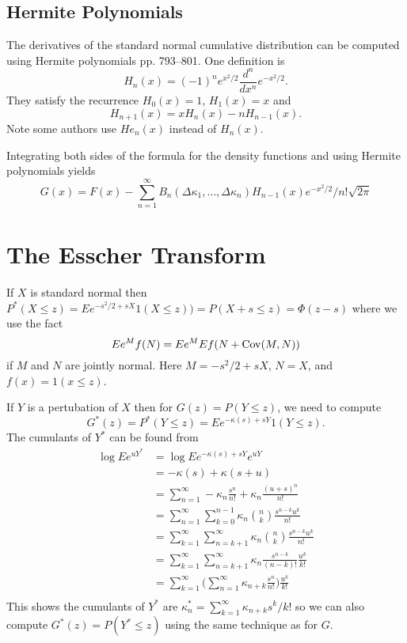 \documentclass[11pt]{article}
\newcommand{\Cov}{\mathop{\rm{Cov}}}
\theoremstyle{definition}
\begin{document}
\subsection{Hermite Polynomials}
The derivatives of the standard normal cumulative distribution 
can be computed using Hermite polynomials\cite{AbrSte1964}
pp. 793--801.
One definition is
\[
H_n(x) = (-1)^n e^{x^2/2}\frac{d^n}{dx^n}e^{-x^2/2}.
\]
They satisfy the recurrence \(H_0(x) = 1\), \(H_1(x) = x\) and
\[
H_{n+1}(x) = xH_n(x) - n H_{n-1}(x).
\]
Note some authors use \(He_n(x)\) instead of \(H_n(x)\).

Integrating both sides of the formula for the density
functions and using Hermite polynomials yields
\[
G(x) = F(x) - \sum_{n=1}^\infty
B_n(\Delta\kappa_1,\dots,\Delta\kappa_n) H_{n-1}(x)
e^{-x^2/2}/n!\sqrt{2\pi}
\]

\section{The Esscher Transform}

If \(X\) is standard normal then
\(P^*(X\le z) = Ee^{-s^2/2 + sX} 1(X\le z)) = P(X + s\le z)
= \Phi(z - s)\)
where we use the fact
\[
Ee^M f(N) = Ee^M Ef(N + \Cov(M,N))
\]
if \(M\) and \(N\) are
jointly normal. Here \(M = -s^2/2 + sX\), \(N = X\), and \(f(x) = 1(x\le z)\).

If \(Y\) is a pertubation of \(X\) then
for \(G(z) = P(Y\le z)\), we need to compute
\[
G^*(z) = P^*(Y\le z) = Ee^{-\kappa(s) + sY}1(Y\le z).
\]
The cumulants of \(Y^*\) can be found from
\begin{align*}
\log E e^{uY^*} &= \log E e^{-\kappa(s) + s Y} e^{uY}\\
&= -\kappa(s) + \kappa(s + u)\\
&= \sum_{n=1}^\infty -\kappa_n \frac{s^n}{n!} 
	+ \kappa_n \frac{(u + s)^n}{n!}\\
&= \sum_{n=1}^\infty \sum_{k=0}^{n-1} \kappa_n \binom{n}{k}
	\frac{s^{n - k}u^k}{n!}\\
&= \sum_{k=1}^\infty \sum_{n=k + 1}^\infty \kappa_n 
	\binom{n}{k}\frac{s^{n - k}u^k}{n!}\\
&= \sum_{k=1}^\infty \sum_{n=k + 1}^\infty \kappa_n \frac{s^{n-k}}{(n-k)!}
	\frac{u^k}{k!}\\
&= \sum_{k=1}^\infty 
	\bigl(\sum_{n=1}^\infty \kappa_{n+k} \frac{s^n}{n!}\bigr)
	\frac{u^k}{k!}\\
\end{align*}
This shows the cumulants of \(Y^*\) are 
\(\kappa^*_n = \sum_{k=1}^\infty \kappa_{n + k}s^k/k!\)
so we can also compute \(G^*(z) = P(Y^* \le z)\) using the same
technique as for \(G\).
\end{document}

